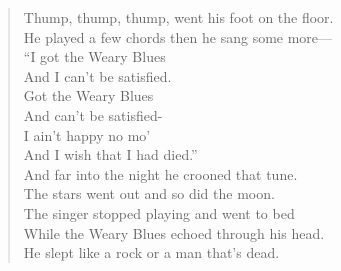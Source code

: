 \begin{verse}
\vspace{1em}
Thump, thump, thump, went his foot on the floor.\\\empty{}
He played a few chords then he sang some more—\\\empty{}
\hspace{1.5em}``I got the Weary Blues\\\empty{}
\hspace{2em}And I can't be satisfied.\\\empty{}
\hspace{2em}Got the Weary Blues\\\empty{}
\hspace{2em}And can't be satisfied-\\\empty{}
\hspace{2em}I ain't happy no mo'\\\empty{}
\hspace{2em}And I wish that I had died.''\\\empty{}
And far into the night he crooned that tune.\\\empty{}
The stars went out and so did the moon.\\\empty{}
The singer stopped playing and went to bed\\\empty{}
While the Weary Blues echoed through his head.\\\empty{}
He slept like a rock or a man that's dead.\\\empty{}
\end{verse}